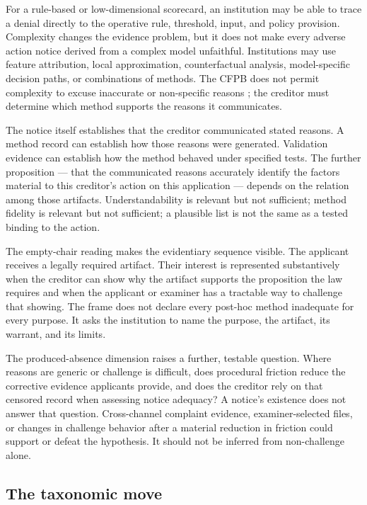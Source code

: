 For a rule-based or low-dimensional scorecard, an institution may be able to trace a denial directly to the operative rule, threshold, input, and policy provision. Complexity changes the evidence problem, but it does not make every adverse action notice derived from a complex model unfaithful. Institutions may use feature attribution, local approximation, counterfactual analysis, model-specific decision paths, or combinations of methods. The CFPB does not permit complexity to excuse inaccurate or non-specific reasons \parencite{cfpbCircular2022_03}; the creditor must determine which method supports the reasons it communicates.

The notice itself establishes that the creditor communicated stated reasons. A method record can establish how those reasons were generated. Validation evidence can establish how the method behaved under specified tests. The further proposition --- that the communicated reasons accurately identify the factors material to this creditor's action on this application --- depends on the relation among those artifacts. Understandability is relevant but not sufficient; method fidelity is relevant but not sufficient; a plausible list is not the same as a tested binding to the action.

The empty-chair reading makes the evidentiary sequence visible. The applicant receives a legally required artifact. Their interest is represented substantively when the creditor can show why the artifact supports the proposition the law requires and when the applicant or examiner has a tractable way to challenge that showing. The frame does not declare every post-hoc method inadequate for every purpose. It asks the institution to name the purpose, the artifact, its warrant, and its limits.

The produced-absence dimension raises a further, testable question. Where reasons are generic or challenge is difficult, does procedural friction reduce the corrective evidence applicants provide, and does the creditor rely on that censored record when assessing notice adequacy? A notice's existence does not answer that question. Cross-channel complaint evidence, examiner-selected files, or changes in challenge behavior after a material reduction in friction could support or defeat the hypothesis. It should not be inferred from non-challenge alone.

\subsection{The taxonomic move}
\label{sec:verification-regimes:taxonomic-move}

